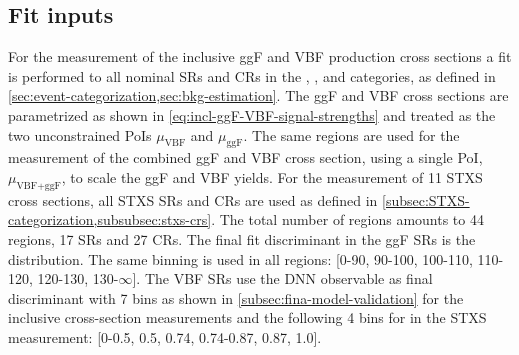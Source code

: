 \subsection{Fit inputs}
For the measurement of the inclusive ggF and VBF production cross sections a fit is performed to all nominal SRs and CRs in the \ZeroJet, \OneJet, and \TwoJet categories, as defined in \cref{sec:event-categorization,sec:bkg-estimation}. 
The ggF and VBF cross sections are parametrized as shown in \cref{eq:incl-ggF-VBF-signal-strengths} and treated as the two unconstrained PoIs $\mu_{\text{VBF}}$ and $\mu_{\text{ggF}}$. 
The same regions are used for the measurement of the combined ggF and VBF cross section, using a single PoI, $\mu_{\text{VBF+ggF}}$, to scale the ggF and VBF yields. 
For the measurement of 11 STXS cross sections, all STXS SRs and CRs are used as defined in \cref{subsec:STXS-categorization,subsubsec:stxs-crs}. The total number of regions amounts to 44 regions, 17 SRs and 27 CRs. 
The final fit discriminant in the ggF SRs is the \mT distribution. The same binning is used in all regions: [0-90, 90-100, 100-110, 110-120, 120-130, 130-$\infty$]. 
The VBF SRs use the DNN observable as final discriminant with 7 bins as shown in \cref{subsec:fina-model-validation} for the inclusive cross-section measurements and the following 4 bins for in the STXS measurement: [0-0.5, 0.5, 0.74, 0.74-0.87, 0.87, 1.0].

